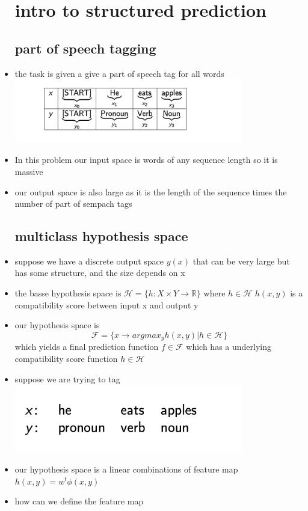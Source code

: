 \documentclass{article}
\begin{document}
\begin{itemize}
\section*{intro to structured prediction}
\subsection*{part of speech tagging}
\item the task is given a give a part of speech tag for all words \\ \includegraphics*[width=10cm]{images/Screenshot 2023-05-14 at 5.04.40 PM.png}
\item In this problem our input space is words of any sequence length so it is massive 
\item our output space is also large as it is the length of the sequence times the number of part of sempach tags
\subsection*{multiclass hypothesis space }
\item suppose we have a discrete output space $y(x)$ that can be very large but has some structure, and the size depends on x 
\item the basse hypothesis space is $\mathcal{H}=\{h:X\times Y\rightarrow \mathbb{R}\}$ where $h\in \mathcal{H}$ $h(x,y)$ is a compatibility score between input x and output y 
\item our hypothesis space is $$\mathcal{F}=\{x\rightarrow argmax_{y}h(x,y)|h\in \mathcal{H}\}$$ which yields a final prediction function $f\in \mathcal{F}$ which has a underlying compatibility score function $h\in \mathcal{H}$ 
\item suppose we are trying to tag \\ \includegraphics*[width=10cm]{images/Screenshot 2023-05-14 at 5.11.49 PM.png} 
\item our hypothesis space is a linear combinations of feature map $h(x,y)=w^{t}\phi(x,y)$
\item how can we define the feature map

\end{itemize}
\end{document}
